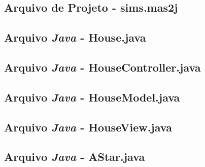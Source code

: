 \subsection*{Arquivo de Projeto - sims.mas2j}


%
%
%

\subsection*{Arquivo \emph{Java} - House.java}


\subsection*{Arquivo \emph{Java} - HouseController.java}


\subsection*{Arquivo \emph{Java} - HouseModel.java}


\subsection*{Arquivo \emph{Java} - HouseView.java}


\subsection*{Arquivo \emph{Java} - AStar.java}


%

